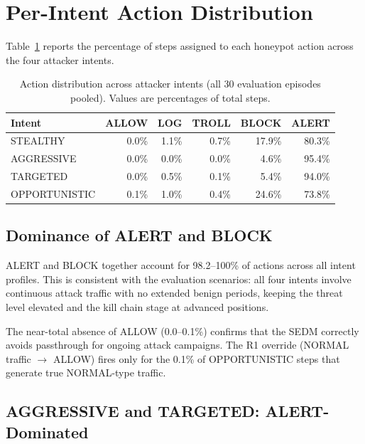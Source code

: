 \section{Per-Intent Action Distribution}
\label{sec:results_action}

Table~\ref{tab:action_dist} reports the percentage of steps assigned to each
honeypot action across the four attacker intents.

\begin{table}[ht]
  \centering
  \caption{Action distribution across attacker intents (all 30 evaluation
           episodes pooled).
           Values are percentages of total steps.}
  \label{tab:action_dist}
  \begin{tabular}{lrrrrr}
    \toprule
    Intent & ALLOW & LOG & TROLL & BLOCK & ALERT \\
    \midrule
    STEALTHY      & 0.0\% & 1.1\% & 0.7\% & 17.9\% & 80.3\% \\
    AGGRESSIVE    & 0.0\% & 0.0\% & 0.0\% &  4.6\% & 95.4\% \\
    TARGETED      & 0.0\% & 0.5\% & 0.1\% &  5.4\% & 94.0\% \\
    OPPORTUNISTIC & 0.1\% & 1.0\% & 0.4\% & 24.6\% & 73.8\% \\
    \bottomrule
  \end{tabular}
\end{table}

\subsection{Dominance of ALERT and BLOCK}

ALERT and BLOCK together account for 98.2--100\% of actions across all
intent profiles.
This is consistent with the evaluation scenarios: all four intents involve
continuous attack traffic with no extended benign periods, keeping the
threat level elevated and the kill chain stage at advanced positions.

The near-total absence of ALLOW (0.0--0.1\%) confirms that the SEDM correctly
avoids passthrough for ongoing attack campaigns.
The R1 override (NORMAL traffic $\to$ ALLOW) fires only for the 0.1\%
of OPPORTUNISTIC steps that generate true NORMAL-type traffic.

\subsection{AGGRESSIVE and TARGETED: ALERT-Dominated}

